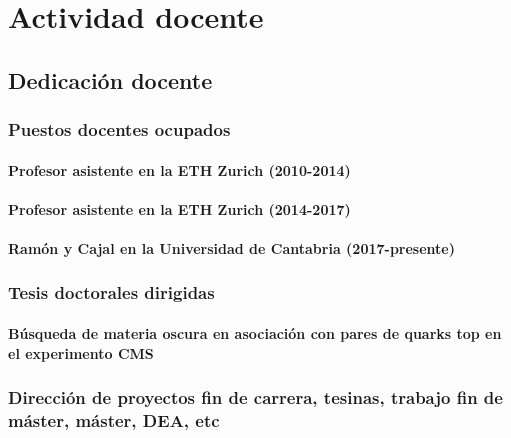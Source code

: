\documentclass[a4paper, 11pt, twoside, openright]{report}
\begin{document}
\chapter{Actividad docente}

\section{Dedicación docente}

\subsection{Puestos docentes ocupados}

\subsubsection{Profesor asistente en la ETH Zurich (2010-2014)}


\subsubsection{Profesor asistente en la ETH Zurich (2014-2017)}


\subsubsection{Ramón y Cajal en la Universidad de Cantabria (2017-presente)}


\subsection{Tesis doctorales dirigidas}

\subsubsection{Búsqueda de materia oscura en asociación con pares de quarks top en el experimento CMS}




\subsection{Dirección de proyectos fin de carrera, tesinas, trabajo fin de máster, máster, DEA, etc}
\end{document}
